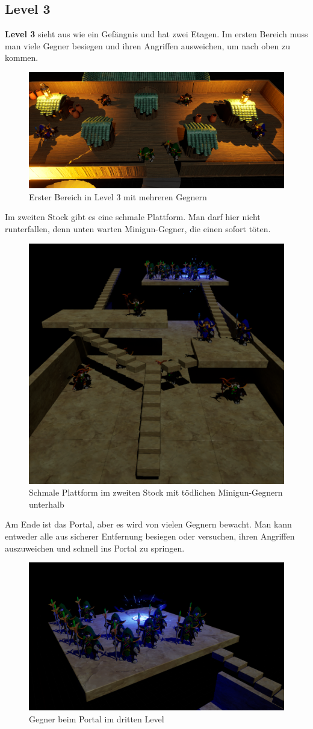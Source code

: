 \documentclass[oneside]{ausarbeitung}
\begin{document}
\subsection{Level 3}
\label{sub:level3}

\textbf{Level 3} sieht aus wie ein Gefängnis und hat zwei Etagen. Im ersten Bereich muss man viele Gegner besiegen und ihren Angriffen ausweichen, um nach oben zu kommen.
\begin{figure}[H]
    \centering
    \includegraphics[width=0.5\linewidth]{First Floor (Level 3).png}
    \caption{Erster Bereich in Level 3 mit mehreren Gegnern}
\end{figure}

Im zweiten Stock gibt es eine schmale Plattform. Man darf hier nicht runterfallen, denn unten warten Minigun-Gegner, die einen sofort töten.

\begin{figure}[H]
    \centering
    \includegraphics[width=0.5\linewidth]{Second Floor (Level 3).png}
    \caption{Schmale Plattform im zweiten Stock mit tödlichen Minigun-Gegnern unterhalb}
\end{figure}

Am Ende ist das Portal, aber es wird von vielen Gegnern bewacht. Man kann entweder alle aus sicherer Entfernung besiegen oder versuchen, ihren Angriffen auszuweichen und schnell ins Portal zu springen.

\begin{figure}[H]
    \centering
    \includegraphics[width=0.5\linewidth]{Enemies near Portal (Level 3).png}
    \caption{Gegner beim Portal im dritten Level}
\end{figure}
\end{document}
